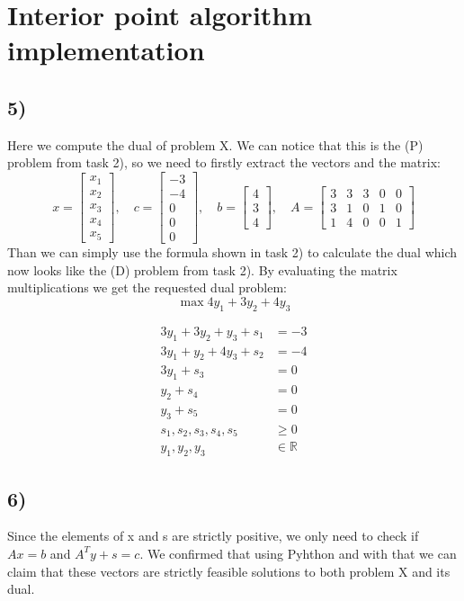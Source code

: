 \documentclass[9pt]{IEEEtran}
\begin{document}
\section{Interior point algorithm implementation}
\subsection*{5)}
Here we compute the dual of problem X. We can notice that this is 
the (P) problem from task 2), so we need to firstly extract the vectors and 
the  matrix: 
\[
x = 
\begin{bmatrix} x_1 \\ x_2 \\ x_3 \\ x_4 \\ x_5 \end{bmatrix}, \quad
c = 
\begin{bmatrix} -3 \\ -4 \\ 0 \\ 0 \\ 0 \end{bmatrix}, \quad
b = 
\begin{bmatrix} 4 \\ 3 \\ 4 \end{bmatrix}, \quad
A = 
\begin{bmatrix}
3 & 3 & 3 & 0 & 0 \\
3 & 1 & 0 & 1 & 0 \\
1 & 4 & 0 & 0 & 1
\end{bmatrix}
\]
Than we can simply use the formula shown in task 2) to calculate the dual which 
now looks like the (D) problem from task 2). By evaluating the matrix 
multiplications we get the requested dual problem:
\[
\max 4y_1 + 3y_2 + 4y_3
\]

\[
\begin{aligned}
3y_1 + 3y_2 + y_3 + s_1 &= -3 \\
3y_1 + y_2 + 4y_3 + s_2 &= -4 \\
3y_1 + s_3 &= 0 \\
y_2 + s_4 &= 0 \\
y_3 + s_5 &= 0 \\
s_1, s_2, s_3, s_4, s_5 &\ge 0 \\
y_1, y_2, y_3 &\in \mathbb{R}
\end{aligned}
\]
\subsection*{6)}
Since the elements of x and s are strictly positive, we only need to check 
if $A x = b$ and $A^T y + s = c$. We confirmed that using Pyhthon and with that 
we can claim that these vectors are strictly feasible solutions to both 
problem X and its dual.
\end{document}
